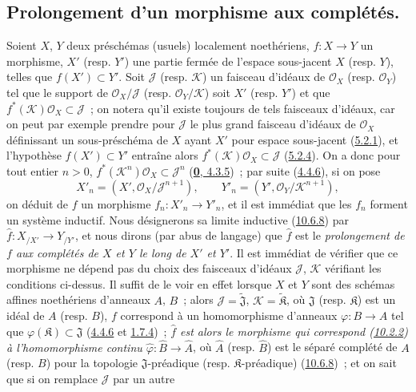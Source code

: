 \subsection{Prolongement d'un morphisme aux complétés.}
\label{subsection:I.10.9-fr}

\begin{env}[10.9.1]
\label{I.10.9.1-fr}
Soient $X$, $Y$ deux préschémas (usuels) localement noethériens,
$f:X\to Y$ un morphisme, $X'$ (resp. $Y'$) une partie fermée de l'espace
sous-jacent $X$ (resp. $Y$), telles que $f(X')\subset Y'$. Soit
$\mathscr{J}$ (resp. $\mathscr{K}$) un faisceau d'idéaux de
$\mathscr{O}_X$ (resp. $\mathscr{O}_Y$) tel que le support de
$\mathscr{O}_X/\mathscr{J}$ (resp. $\mathscr{O}_Y/\mathscr{K}$) soit
$X'$ (resp. $Y'$) et que
$f^*(\mathscr{K})\mathscr{O}_X\subset\mathscr{J}$~; on notera qu'il
existe toujours de tels faisceaux d'idéaux, car on peut par exemple prendre
pour $\mathscr{J}$ le plus grand faisceau d'idéaux de $\mathscr{O}_X$
définissant un sous-préschéma de $X$ ayant $X'$ pour espace sous-jacent
(\hyperref[I.5.2.1-fr]{5.2.1}), et l'hypothèse $f(X')\subset Y'$ entraîne
alors $f^*(\mathscr{K})\mathscr{O}_X\subset\mathscr{J}$
(\hyperref[I.5.2.4-fr]{5.2.4}). On a donc pour tout entier $n>0$,
$f^*(\mathscr{K}^n)\mathscr{O}_X\subset\mathscr{J}^n$
(\hyperref[0.4.3.5-fr]{\textbf{0}, 4.3.5})~; par suite
(\hyperref[I.4.4.6-fr]{4.4.6}), si on pose
\[
  X'_n=(X',\mathscr{O}_X/\mathscr{J}^{n+1}),\qquad
  Y'_n=(Y',\mathscr{O}_Y/\mathscr{K}^{n+1}),
\]
on déduit de $f$ un morphisme $f_n:X'_n\to Y'_n$, et il est immédiat que
les $f_n$ forment un système inductif. Nous désignerons sa limite inductive
(\hyperref[I.10.6.8-fr]{10.6.8}) par
$\widehat f:X_{/X'}\to Y_{/Y'}$, et nous dirons (par abus de langage) que
$\widehat f$ est le \emph{prolongement de $f$ aux complétés de $X$ et $Y$
le long de $X'$ et $Y'$}. Il est immédiat de vérifier que ce morphisme ne
dépend pas du choix des faisceaux d'idéaux $\mathscr{J}$, $\mathscr{K}$
vérifiant les conditions ci-dessus. Il suffit de le voir en effet lorsque
$X$ et $Y$ sont des schémas affines noethériens d'anneaux $A$, $B$~; alors
$\mathscr{J}=\widetilde{\mathfrak{J}}$,
$\mathscr{K}=\widetilde{\mathfrak{K}}$, où $\mathfrak{J}$ (resp.
$\mathfrak{K}$) est un idéal de $A$ (resp. $B$), $f$ correspond à un
homomorphisme d'anneaux $\varphi:B\to A$ tel que
$\varphi(\mathfrak{K})\subset\mathfrak{J}$
(\hyperref[I.4.4.6-fr]{4.4.6} et
\hyperref[I.1.7.4-fr]{1.7.4})~; \emph{$\widehat f$ est alors le morphisme
qui correspond \textup{(\hyperref[I.10.2.2-fr]{10.2.2})} à l'homomorphisme continu
$\widehat\varphi:\widehat B\to\widehat A$}, où $\widehat A$ (resp.
$\widehat B$) est le séparé complété de $A$ (resp. $B$) pour la topologie
$\mathfrak{J}$-préadique (resp. $\mathfrak{K}$-préadique)
(\hyperref[I.10.6.8-fr]{10.6.8})~; et on sait que si on remplace
$\mathscr{J}$ par un autre


\end{env}
